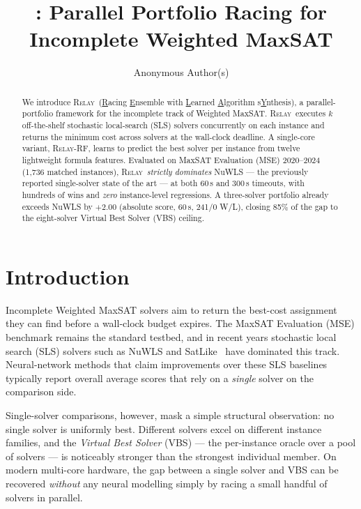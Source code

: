 \documentclass[11pt,letterpaper]{article}
\title{\RELAY: Parallel Portfolio Racing for\\ Incomplete Weighted MaxSAT}
\author{Anonymous Author(s)}
\date{}
\newcommand{\RELAY}{\textsc{Relay}}
\begin{document}
\maketitle

\begin{abstract}
We introduce \RELAY\ (\underline{R}acing \underline{E}nsemble with \underline{L}earned \underline{A}lgorithm s\underline{Y}nthesis), a parallel-portfolio framework for the incomplete track of Weighted MaxSAT.  \RELAY\ executes $k$ off-the-shelf stochastic local-search (SLS) solvers concurrently on each instance and returns the minimum cost across solvers at the wall-clock deadline.  A single-core variant, \RELAY-RF, learns to predict the best solver per instance from twelve lightweight formula features.  Evaluated on MaxSAT Evaluation (MSE) 2020--2024 (1{,}736 matched instances), \RELAY\ \emph{strictly dominates} NuWLS --- the previously reported single-solver state of the art --- at both 60\,s and 300\,s timeouts, with hundreds of wins and \emph{zero} instance-level regressions.  A three-solver portfolio already exceeds NuWLS by $+2.00$ (absolute score, 60\,s, 241/0 W/L), closing 85\% of the gap to the eight-solver Virtual Best Solver (VBS) ceiling.
\end{abstract}

\section{Introduction}

Incomplete Weighted MaxSAT solvers aim to return the best-cost assignment they can find before a wall-clock budget expires.  The MaxSAT Evaluation (MSE) benchmark \citep{mse2020,mse2024} remains the standard testbed, and in recent years stochastic local search (SLS) solvers such as NuWLS \citep{nuwls2023} and SatLike~\citep{satlike} have dominated this track.  Neural-network methods that claim improvements over these SLS baselines typically report overall average scores that rely on a \emph{single} solver on the comparison side.

Single-solver comparisons, however, mask a simple structural observation: no single solver is uniformly best.  Different solvers excel on different instance families, and the \emph{Virtual Best Solver} (VBS) --- the per-instance oracle over a pool of solvers --- is noticeably stronger than the strongest individual member.  On modern multi-core hardware, the gap between a single solver and VBS can be recovered \emph{without} any neural modelling simply by racing a small handful of solvers in parallel.
\end{document}
